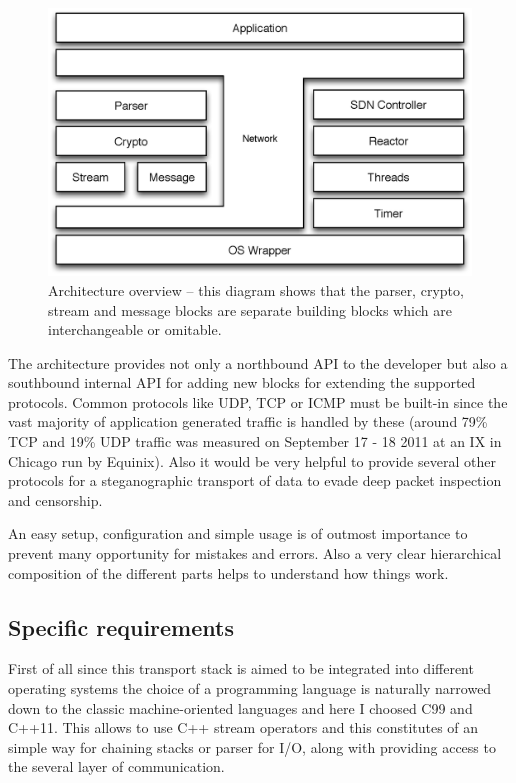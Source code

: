 \documentclass[twocolumn,english]{IEEEtran}
\theoremstyle{plain}
\theoremstyle{plain}
\begin{document}
\begin{figure}[h]
\includegraphics[width=\columnwidth]{Architecture_overview.eps}
\caption{Architecture overview -- this diagram shows that the parser, crypto,
stream and message blocks are separate building blocks which are
interchangeable or omitable.}
\label{fig:arch-overview}
\end{figure}

The architecture provides not only a northbound API to the developer but also
a southbound internal API for adding new blocks for extending the supported
protocols. Common protocols like UDP, TCP or ICMP must be built-in since the
vast majority of application generated traffic is handled by these (around 79\%
TCP and 19\% UDP traffic was measured on September 17 - 18 2011 at an IX in
Chicago run by Equinix\cite{caida:application-protocol-percentage}). Also it
would be very helpful to provide several other protocols for a steganographic
transport of data\cite{ijcsi:dns-steganography} to evade deep packet
inspection and censorship.

An easy setup, configuration and simple usage is of outmost importance to
prevent many opportunity for mistakes and errors. Also a very clear
hierarchical composition of the different parts helps to understand how things
work.

\subsection{Specific requirements}

First of all since this transport stack is aimed to be integrated into
different operating systems the choice of a programming language is naturally
narrowed down to the classic machine-oriented languages and here I choosed C99
and C++11. This allows to use C++ stream operators and this constitutes of an
simple way for chaining stacks or parser for I/O, along with providing access
to the several layer of communication.
\end{document}
